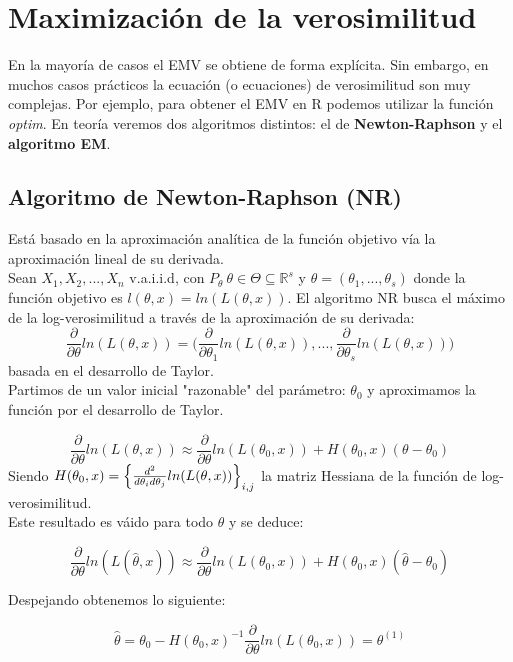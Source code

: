 
\section{Maximización de la verosimilitud}

En la mayoría de casos el EMV se obtiene de forma explícita. Sin embargo, en muchos casos prácticos la ecuación (o ecuaciones) de verosimilitud son muy complejas.
Por ejemplo, para obtener el EMV en R podemos utilizar la función \textit{optim}. En teoría veremos dos algoritmos distintos: el de \textbf{Newton-Raphson} y el \textbf{algoritmo EM}. 

\subsection{Algoritmo de Newton-Raphson (NR)}

Está basado en la aproximación analítica de la función objetivo vía la aproximación lineal de su derivada. \\

Sean $X_1, X_2,...,X_n$ v.a.i.i.d, con $P_\theta\ \theta\in\Theta\subseteq \mathbb{R}^s$ y $\theta=(\theta_1,...,\theta_s)$ donde la función objetivo es $l(\theta,x)=ln(L(\theta,x))$.
El algoritmo NR busca el máximo de la log-verosimilitud a través de la aproximación de su derivada: 
$$\frac{\partial}{\partial\theta}ln(L(\theta,x))=\Big(\frac{\partial}{\partial\theta_1}ln(L(\theta,x)),...,\frac{\partial}{\partial\theta_s}ln(L(\theta,x))\Big)$$
basada en el desarrollo de Taylor.\\

Partimos de un valor inicial "razonable" del parámetro: $\theta_0$ y aproximamos la función por el desarrollo de Taylor.

$$\frac{\partial}{\partial\theta}ln(L(\theta,x))\approx\frac{\partial}{\partial\theta}ln(L(\theta_0,x))+H(\theta_0,x)(\theta-\theta_0)$$
Siendo $H(\theta_0,x)=\Big{\{}\frac{d^2}{d\theta_i d\theta_j}ln(L(\theta,x))\Big{\}}_{i,j}$ la matriz Hessiana de la función de log-verosimilitud. \\

Este resultado es váido para todo $\theta$ y se deduce:

$$\frac{\partial}{\partial\theta}ln(L(\hat\theta,x))\approx\frac{\partial}{\partial\theta}ln(L(\theta_0,x))+H(\theta_0,x)(\hat\theta-\theta_0)$$

Despejando obtenemos lo siguiente:

$$\hat\theta=\theta_0-H(\theta_0,x)^{-1}\frac{\partial}{\partial\theta}ln(L(\theta_0,x))=\theta^{(1)}$$

